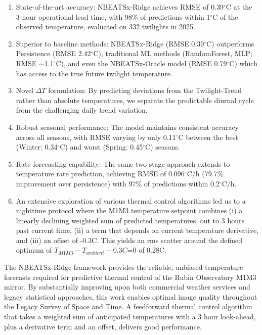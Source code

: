 \documentclass[twocolumn]{aastex631}
\begin{document}
\begin{enumerate}
    \item State-of-the-art accuracy: NBEATSx-Ridge achieves RMSE of 0.39$^\circ$C at the 3-hour operational lead time, with 98\% of predictions within 1$^\circ$C of the observed temperature, evaluated on 332 twilights in 2025.

    \item Superior to baseline methods: NBEATSx-Ridge (RMSE 0.39$^\circ$C) outperforms Persistence (RMSE 2.42$^\circ$C), traditional ML methods (RandomForest, MLP; RMSE $\sim$1.1$^\circ$C), and even the NBEATSx-Oracle model (RMSE 0.79$^\circ$C) which has access to the true future twilight temperature.

    \item Novel $\Delta T$ formulation: By predicting deviations from the Twilight-Trend rather than absolute temperatures, we separate the predictable diurnal cycle from the challenging daily trend variation.

    \item Robust seasonal performance: The model maintains consistent accuracy across all seasons, with RMSE varying by only 0.11$^\circ$C between the best (Winter: 0.34$^\circ$C) and worst (Spring: 0.45$^\circ$C) seasons.

    \item Rate forecasting capability: The same two-stage approach extends to temperature rate prediction, achieving RMSE of 0.096$^\circ$C/h (79.7\% improvement over persistence) with 97\% of predictions within 0.2$^\circ$C/h.

    \item An extensive exploration of various thermal control algorithms led us to a nighttime protocol where the M1M3 temperature setpoint combines (i) a linearly declining weighted sum of predicted temperatures, out to 3 hours past current time, (ii) a term that depends on current temperature derivative, and (iii) an offset of -0.3C. This yields an rms scatter around the defined optimum of $T_{M1M3}-T_{ambient}-0.3C$=0 of 0.28C. 
\end{enumerate}

The NBEATSx-Ridge framework provides the reliable, unbiased temperature forecasts required for predictive thermal control of the Rubin Observatory M1M3 mirror. By substantially improving upon both commercial weather services and legacy statistical approaches, this work enables optimal image quality throughout the Legacy Survey of Space and Time. A feedforward thermal control algorithm that takes a weighted sum of anticipated temperatures with a 3 hour look-ahead, plus a derivative term and an offset, delivers good performance. 
\end{document}
